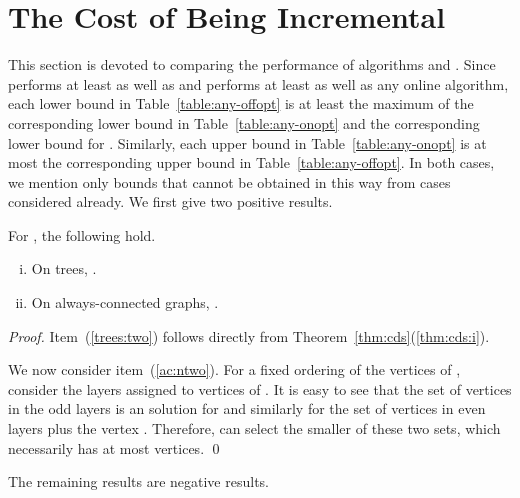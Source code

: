 \section{The Cost of Being Incremental}
\label{sec:offline}
This section is devoted to comparing the performance of
\incr algorithms and \offopt.
Since \offopt{} performs at least as well as \onopt and \onopt
performs at least as well as any online algorithm, each lower bound
in Table~\ref{table:any-offopt} is at least the maximum of
the corresponding lower bound in Table~\ref{table:any-onopt} and
the corresponding lower bound for .
Similarly, each upper bound in Table~\ref{table:any-onopt} is at most
the corresponding upper bound in
Table~\ref{table:any-offopt}.
In both cases, we mention only bounds
that cannot be obtained in this way from cases considered already.
We first give two positive results.

\begin{proposition}
For \ds, the following hold.
\begin{enumerate}[(i)]
\item \label{trees:two}
 On trees, .
\item \label{ac:ntwo}
 On always-connected graphs, .
\end{enumerate}
\end{proposition}
\begin{proof}
Item~(\ref{trees:two}) follows directly from
Theorem~\ref{thm:cds}(\ref{thm:cds:i}).

We now consider item~(\ref{ac:ntwo}).
For a fixed ordering of the vertices of , consider the layers
 assigned
to vertices of . It is easy to see that the set of vertices
in the odd layers is an \incr solution for \ds and similarly
for the set of vertices in even layers plus the vertex . Therefore,
\onopt can select the smaller of these two sets, which necessarily
has at most  vertices.
\qed\end{proof}

The remaining results are negative results.

